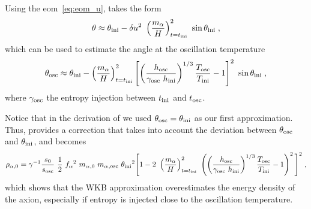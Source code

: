 \documentclass[11pt,a4paper]{article}
\begin{document}
Using the eom~\ref{eq:eom_u},  takes the form
%
\begin{eqnarray}
	\theta \approx    \thetai - \delta u^2 \ \lrb{\dfrac{\ma}{H}}_{t=\ti}^2 \ \sin \thetai \;,
	\label{eq:theta_du}
\end{eqnarray}
%
which can be used to estimate the angle at the oscillation temperature
%
\begin{eqnarray}
	\theta_{\rm osc} \approx    \theta_{\rm ini}{} -  \left( \dfrac{m_\alpha{}}{H} \right)_{t=t_{\rm ini}{}}^2 \left[  \left( \dfrac{h_{\rm osc}}{\gamma_{\rm osc} \ h_{\rm ini}} \right)^{1/3} \dfrac{T_{\rm osc}}{T_{\rm ini}} -1  \right] ^{2}   \ \sin \theta_{\rm ini}{} \;,
	\label{eq:theta_osc}
\end{eqnarray}
%
where  $\gamma_{\rm osc}$ the entropy injection between $t_{\rm ini}{}$ and $t_{\rm osc}$.

Notice that in the derivation of  we used $\theta_{\rm osc} = \theta_{\rm ini}{}$ as our first approximation. Thus,  provides a correction that takes into account the deviation between $\theta_{\rm osc} $ and $ \theta_{\rm ini}{}$, and  becomes
%
\begin{eqnarray}
	\rho _{\alpha,0} = \gamma^{-1}  \dfrac{s_0}{s_{\rm osc}} \  \dfrac{1 }{2}  \ f_{\alpha}{}^2 \ m_\alpha{}_{,0} \ m_\alpha{}_{,{\rm osc}} \ \theta_{\rm ini}{}^2 \Bigg[ 
	1 -2 \ \left( \dfrac{m_\alpha{}}{H} \right)_{t=t_{\rm ini}{}}^2 \  \left( \left( \dfrac{h_{\rm osc}}{\gamma_{\rm osc} \ h_{\rm ini}} \right)^{1/3} \dfrac{T_{\rm osc}}{T_{\rm ini}}-1  \right) ^{2}    \Bigg]^2    \;,
	\label{eq:rho_a_approx} 
\end{eqnarray}
%
which shows that the WKB approximation overestimates the energy density of the axion, especially if entropy is injected close to the oscillation temperature.


\newpage
 {}
                         
\end{document}
